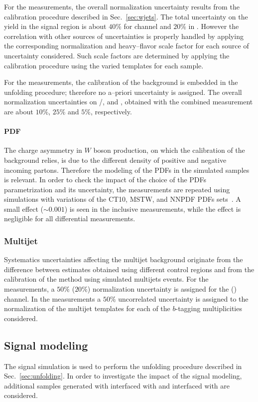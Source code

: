 For the \seventev{} measurements, the overall \wjets{} normalization
uncertainty results from the calibration procedure described in
Sec.~\ref{sec:wjets}. The total uncertainty on the \wjets{} yield in
the signal region is about $40\%$ for \ejets{} channel and $20\%$ in
\mujets{}. However the correlation with other sources of uncertainties
is properly handled by applying the corresponding normalization and
heavy--flavor scale factor for each source of uncertainty considered.
Such scale factors are determined by applying the calibration
procedure using the varied templates for each sample.

For the \eighttev{} measurements, the calibration of the \wjets{}
background is embedded in the unfolding procedure; therefore no
a--priori uncertainty is assigned. The overall normalization
uncertainties on \wbb{}/\wcc{}, \wc{} and \wlight, obtained with the
combined \ljets{} measurement  are about $10\%$, $25\%$ and $5\%$,
respectively.

\paragraph{PDF}
\label{sec:syst_pdf}

The charge asymmetry in $W$ boson production, on which the calibration
of the \wjets{} background relies, is due to the different density of
positive and negative incoming partons. Therefore the modeling of the
PDFs in the simulated \wjets{} samples is relevant. In order to check
the impact of the choice of the PDFs parametrization and its
uncertainty, the measurements are repeated using \wjets{} simulations
with variations of the CT10, MSTW, and NNPDF PDFs
sets~\cite{pdf4lhc}. A small effect ($\sim0.001$) is seen in the
inclusive \ac{} measurements, while the effect is negligible for all
differential measurements.

\subsubsection{Multijet}
\label{sec:syst_qcd}

Systematics uncertainties affecting the multijet background originate
from the difference between estimates obtained using different control
regions and from the calibration of the method using simulated
multijets events. For the \seventev{} measurements, a $50\%$ ($20\%$)
normalization uncertainty is assigned for the \ejets{} (\mujets{})
channel.
In the \eighttev{} measurements a $50\%$ uncorrelated uncertainty is assigned to the
normalization of the multijet templates for each of the $b$-tagging
multiplicities considered.

\subsection{Signal modeling}

The signal simulation is used to perform the unfolding procedure
described in Sec.~\ref{sec:unfolding}. In order to investigate the
impact of the \ttbar{} signal modeling, additional samples generated
with \powheg{} interfaced with \herwig{} and \mcatnlo{}
interfaced with \herwig{} are considered. 